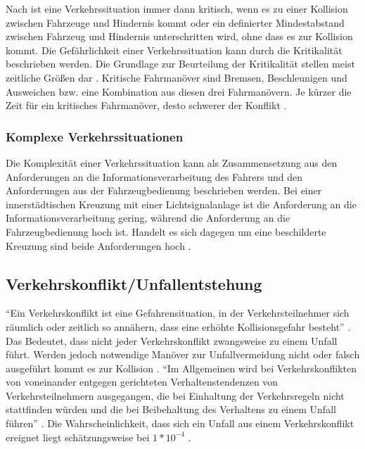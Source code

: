 Nach \Textcite[S. 30]{Schmidt.2010} ist eine Verkehrssituation immer dann kritisch, wenn es zu einer Kollision zwischen Fahrzeuge und Hindernis kommt oder ein definierter Mindestabstand zwischen Fahrzeug und Hindernis unterschritten wird, ohne dass es zur Kollision kommt. Die Gefährlichkeit einer Verkehrssituation kann durch die Kritikalität beschrieben werden. Die Grundlage zur Beurteilung der Kritikalität stellen meist zeitliche Größen dar \parencite[S. 39]{Gerstenberger.17.02.2015}. Kritische Fahrmanöver sind Bremsen, Beschleunigen und Ausweichen bzw. eine Kombination aus diesen drei Fahrmanövern. Je kürzer die Zeit für ein kritisches Fahrmanöver, desto schwerer der Konflikt \parencite[S. 26]{Erke.1978}.

\subsubsection{Komplexe Verkehrssituationen}
Die Komplexität einer Verkehrssituation kann als Zusammensetzung aus den Anforderungen an die Informationsverarbeitung des Fahrers und den Anforderungen aus der Fahrzeugbedienung beschrieben werden. Bei einer innerstädtischen Kreuzung mit einer Lichtsignalanlage ist die Anforderung an die Informationsverarbeitung gering, während die Anforderung an die Fahrzeugbedienung hoch ist. Handelt es sich dagegen um eine beschilderte Kreuzung sind beide Anforderungen hoch \parencite[S. 36f]{Gerstenberger.17.02.2015}.

\subsection{Verkehrskonflikt/Unfallentstehung}
\enquote{Ein Verkehrskonflikt ist eine Gefahrensituation, in der Verkehrsteilnehmer sich räumlich oder zeitlich so annähern, dass eine erhöhte Kollisionsgefahr besteht} \parencite[S. 26]{Erke.1978}. Das Bedeutet, dass nicht jeder Verkehrskonflikt zwangsweise zu einem Unfall führt. Werden jedoch notwendige Manöver zur Unfallvermeidung nicht oder falsch ausgeführt kommt es zur Kollision \parencite[S. 43]{Fricke.2006}. \enquote{Im Allgemeinen wird bei Verkehrskonflikten von voneinander entgegen gerichteten Verhaltenstendenzen von Verkehrsteilnehmern ausgegangen, die bei Einhaltung der Verkehrsregeln nicht stattfinden würden und die bei Beibehaltung des Verhaltens zu einem Unfall führen} \parencite[S. 10]{Hoffmann.26.04.2013}. Die Wahrscheinlichkeit, dass sich ein Unfall aus einem Verkehrskonflikt ereignet liegt schätzungsweise bei $1\ast 10^{-4}$ \parencite[S. 99]{Reichart.2001}.

